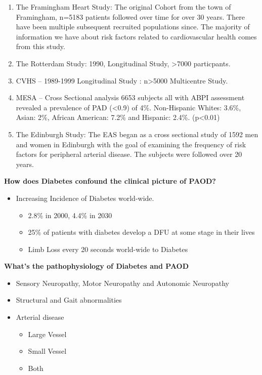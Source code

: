 \documentclass[
]{book}
\begin{document}
\begin{enumerate}
\def\labelenumi{\arabic{enumi}.}
\item
  The Framingham Heart Study: The original Cohort from the town of
  Framingham, n=5183 patients followed over time for over 30 years.
  There have been multiple subsequent recruited populations since. The
  majority of information we have about risk factors related to
  cardiovascular health comes from this study.
  \citep{mahmoodFraminghamHeartStudy2014}
\item
  The Rotterdam Study: 1990, Longitudinal Study, \textgreater7000 particpants.
\item
  CVHS -- 1989-1999 Longitudinal Study : n\textgreater5000 Multicentre Study.
\item
  MESA -- Cross Sectional analysis 6653 subjects all with ABPI
  assessment revealed a prevalence of PAD (\textless0.9) of 4\%. Non-Hispanic
  Whites: 3.6\%, Asian: 2\%, African American: 7.2\% and Hispanic: 2.4\%.
  (p\textless0.01) \citep{allisonEffectNovelCardiovascular2006}
\item
  The Edinburgh Study: The EAS began as a cross sectional study of
  1592 men and women in Edinburgh with the goal of examining the
  frequency of risk factors for peripheral arterial disease. The
  subjects were followed over 20 years.
  \citep{fowkesEdinburghArteryStudy1991}
\end{enumerate}

\textbf{How does Diabetes confound the clinical picture of PAOD?}

\begin{itemize}
\item
  Increasing Incidence of Diabetes world-wide.
  \citep{boultonGlobalBurdenDiabetic2005}

  \begin{itemize}
  \item
    2.8\% in 2000, 4.4\% in 2030
  \item
    25\% of patients with diabetes develop a DFU at some stage in
    their lives
  \item
    Limb Loss every 20 seconds world-wide to Diabetes
  \end{itemize}
\end{itemize}

\textbf{What's the pathophysiology of Diabetes and PAOD}
\citep{armstrong26PathophysiologyPrinciplesManagement2012}

\begin{itemize}
\item
  Sensory Neuropathy, Motor Neuropathy and Autonomic Neuropathy
\item
  Structural and Gait abnormalities
\item
  Arterial disease

  \begin{itemize}
  \item
    Large Vessel
  \item
    Small Vessel
  \item
    Both
  \end{itemize}
\end{itemize}
\end{document}
